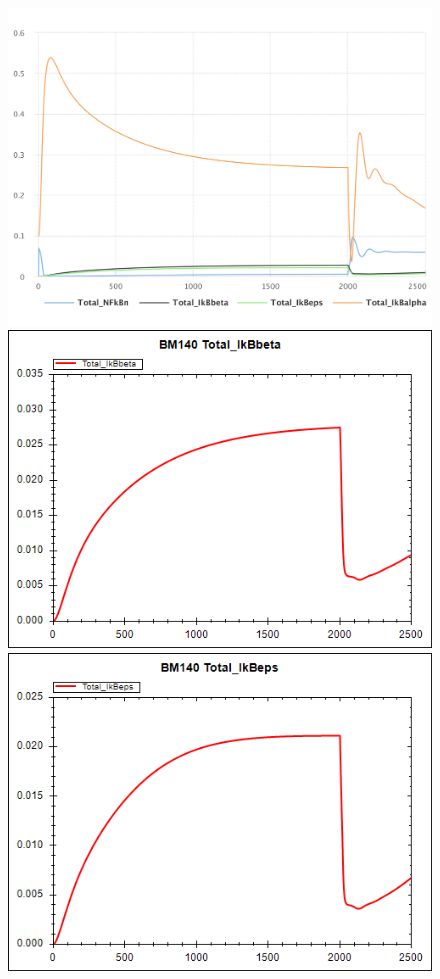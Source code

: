 \begin{figure}[ht]
    \centering
    \begin{minipage}{0.47\textwidth}
        \centering
        \includegraphics[width=1.0\textwidth]{examples/ikappab/results/sedml_webtools/plot1}
		\includegraphics[width=1.0\textwidth]{examples/ikappab/results/sedml_webtools/plot2}
		\includegraphics[width=1.0\textwidth]{examples/ikappab/results/sedml_webtools/plot3}

\end{minipage}
\end{figure}

